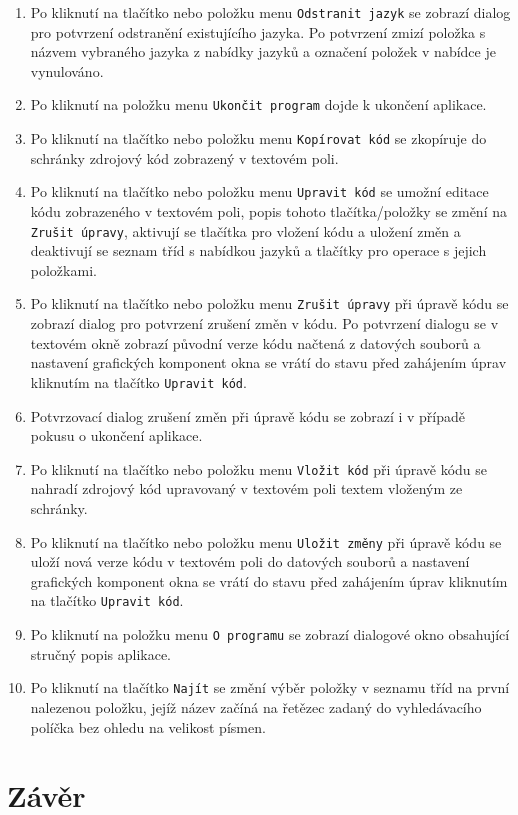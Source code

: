 \documentclass[onepage, a4paper, 12pt]{bakalarka}
\begin{document}
\begin{enumerate}
\item{Po kliknutí na tlačítko nebo položku menu \texttt{Odstranit jazyk} se zobrazí dialog pro potvrzení odstranění existujícího jazyka. Po potvrzení zmizí položka s názvem vybraného jazyka z nabídky jazyků a označení položek v nabídce je vynulováno.}
\item{Po kliknutí na položku menu \texttt{Ukončit program} dojde k ukončení aplikace.}
\item{Po kliknutí na tlačítko nebo položku menu \texttt{Kopírovat kód} se zkopíruje do schránky zdrojový kód zobrazený v textovém poli.}
\item{Po kliknutí na tlačítko nebo položku menu \texttt{Upravit kód} se umožní editace kódu zobrazeného v textovém poli, popis tohoto tlačítka/položky se změní na \texttt{Zrušit úpravy}, aktivují se tlačítka pro vložení kódu a uložení změn a deaktivují se seznam tříd s nabídkou jazyků a tlačítky pro operace s jejich položkami.}
\item{Po kliknutí na tlačítko nebo položku menu \texttt{Zrušit úpravy} při úpravě kódu se zobrazí dialog pro potvrzení zrušení změn v kódu. Po potvrzení dialogu se v textovém okně zobrazí původní verze kódu načtená z datových souborů a nastavení grafických komponent okna se vrátí do stavu před zahájením úprav kliknutím na tlačítko \texttt{Upravit kód}.} \item{Potvrzovací dialog zrušení změn při úpravě kódu se zobrazí i v případě pokusu o ukončení aplikace.}
\item{Po kliknutí na tlačítko nebo položku menu \texttt{Vložit kód} při úpravě kódu se nahradí zdrojový kód upravovaný v textovém poli textem vloženým ze schránky.}
\item{Po kliknutí na tlačítko nebo položku menu \texttt{Uložit změny} při úpravě kódu se uloží nová verze kódu v textovém poli do datových souborů a nastavení grafických komponent okna se vrátí do stavu před zahájením úprav kliknutím na tlačítko \texttt{Upravit kód}.}
\item{Po kliknutí na položku menu \texttt{O programu} se zobrazí dialogové okno obsahující stručný popis aplikace.}
\item{Po kliknutí na tlačítko \texttt{Najít} se změní výběr položky v seznamu tříd na první nalezenou položku, jejíž název začíná na řetězec zadaný do vyhledávacího políčka bez ohledu na velikost písmen.}
\end{enumerate}

\chapter{Závěr}
\appendix


\end{document}
